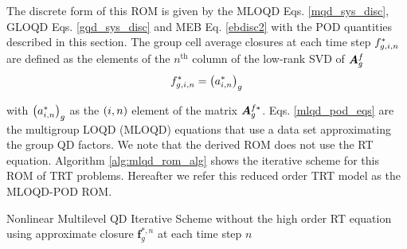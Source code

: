 	The discrete form of this ROM is given by the MLOQD Eqs. \eqref{mqd_sys_disc}, GLOQD Eqs. \eqref{gqd_sys_disc} and MEB Eq. \eqref{ebdisc2} with the POD quantities described in this section. The group cell average closures at each time step $f_{g,i,n}^*$ are defined as the elements of the $n^{\text{th}}$ column of the low-rank SVD of $\bm{A}_g^f$
	\begin{equation}
		f_{g,i,n}^* = \left( a_{i,n}^*\right)_g
	\end{equation}
	
	with $\left( a_{i,n}^*\right)_g$ as the $\left( i,n\right)$ element of the matrix $\bm{A}_g^{f*}$. Eqs. \eqref{mlqd_pod_eqs} are the multigroup LOQD (MLOQD) equations that use a data set approximating the group QD factors. We note that the derived ROM does not use the RT equation. Algorithm \ref{alg:mlqd_rom_alg} shows the iterative scheme for this ROM of TRT problems. Hereafter we refer this reduced order TRT model as the MLOQD-POD ROM.
	
	\begin{algorithm}[ht!]
		\SetAlgoLined
		\caption{Nonlinear Multilevel QD Iterative Scheme without the high order RT equation using approximate closure $\bm{f}_g^{*,n}$ at each time step $n$ \label{alg:mlqd_rom_alg}}
	\end{algorithm}
	
